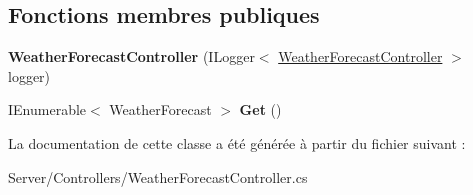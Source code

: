 \subsection*{Fonctions membres publiques}
\begin{DoxyCompactItemize}
\item 
\mbox{\label{class_mediwatch_1_1_server_1_1_controllers_1_1_weather_forecast_controller_a8557f93a28d98c9487aa7c812cb61c18}} 
{\bfseries Weather\+Forecast\+Controller} (I\+Logger$<$ \hyperlink{class_mediwatch_1_1_server_1_1_controllers_1_1_weather_forecast_controller}{Weather\+Forecast\+Controller} $>$ logger)
\item 
\mbox{\label{class_mediwatch_1_1_server_1_1_controllers_1_1_weather_forecast_controller_a43eaa75ecf6f43cba687aeb38a08636f}} 
I\+Enumerable$<$ Weather\+Forecast $>$ {\bfseries Get} ()
\end{DoxyCompactItemize}


La documentation de cette classe a été générée à partir du fichier suivant \+:\begin{DoxyCompactItemize}
\item 
Server/\+Controllers/Weather\+Forecast\+Controller.\+cs\end{DoxyCompactItemize}
